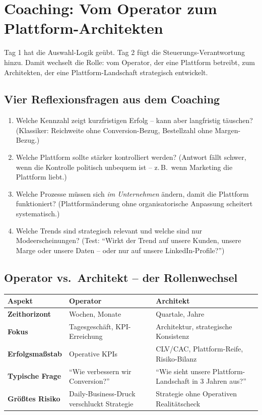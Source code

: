 \documentclass[11pt,a4paper,oneside]{article}
\begin{document}
\section{Coaching: Vom Operator zum Plattform-Architekten}

Tag 1 hat die Auswahl-Logik geübt. Tag 2 fügt die Steuerungs-Verantwortung hinzu. Damit wechselt die Rolle: vom Operator, der eine Plattform betreibt, zum Architekten, der eine Plattform-Landschaft strategisch entwickelt.

\subsection{Vier Reflexionsfragen aus dem Coaching}

\begin{enumerate}
  \item Welche Kennzahl zeigt kurzfristigen Erfolg -- kann aber langfristig täuschen? (Klassiker: Reichweite ohne Conversion-Bezug, Bestellzahl ohne Margen-Bezug.)
  \item Welche Plattform sollte stärker kontrolliert werden? (Antwort fällt schwer, wenn die Kontrolle politisch unbequem ist -- z.\,B.\ wenn Marketing die Plattform liebt.)
  \item Welche Prozesse müssen sich \emph{im Unternehmen} ändern, damit die Plattform funktioniert? (Plattform­änderung ohne organisatorische Anpassung scheitert systematisch.)
  \item Welche Trends sind strategisch relevant und welche sind nur Modeerscheinungen? (Test: ``Wirkt der Trend auf unsere Kunden, unsere Marge oder unsere Daten -- oder nur auf unsere LinkedIn-Profile?'')
\end{enumerate}

\subsection{Operator vs.\ Architekt -- der Rollenwechsel}

\begin{tabularx}{\linewidth}{@{}>{\bfseries}lX X@{}}
\toprule
Aspekt           & Operator                                  & Architekt \\
\midrule
Zeithorizont     & Wochen, Monate                           & Quartale, Jahre \\
Fokus            & Tagesgeschäft, KPI-Erreichung             & Architektur, strategische Konsistenz \\
Erfolgsmaßstab   & Operative KPIs                            & CLV/CAC, Plattform-Reife, Risiko-Bilanz \\
Typische Frage   & ``Wie verbessern wir Conversion?''        & ``Wie sieht unsere Plattform-Landschaft in 3 Jahren aus?'' \\
Größtes Risiko   & Daily-Business-Druck verschluckt Strategie & Strategie ohne Operativen Realitätscheck \\
\bottomrule
\end{tabularx}
\end{document}
